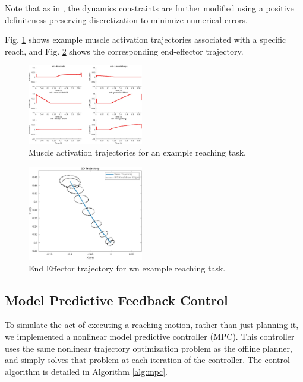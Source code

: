 \documentclass[letterpaper, 10pt, conference]{ieeeconf}
\newcommand{\todo}[1]{\textcolor{red}{\textbf{TODO:} #1}}
\begin{document}
Note that as in \cite{stochastic_model}, the dynamics constraints are further modified using a positive definiteness preserving discretization to minimize numerical errors.

Fig. \ref{fig:demo_activations} shows example muscle activation trajectories associated with a specific reach, and Fig. \ref{fig:demo_position} shows the corresponding end-effector trajectory.
\begin{figure}
    \centering
    \includegraphics[width=0.45\textwidth]{images/demo_activations_small.jpg}
    \caption{Muscle activation trajectories for an example reaching task.}
    \label{fig:demo_activations}
\end{figure}

\begin{figure}
    \centering
    \includegraphics[width=0.45\textwidth]{images/demo_traj_small.jpg}
    \caption{End Effector trajectory for wn example reaching task.}
    \label{fig:demo_position}
\end{figure}


\subsection{Model Predictive Feedback Control}
To simulate the act of executing a reaching motion, rather than just planning it, we implemented a nonlinear model predictive controller (MPC). This controller uses the same nonlinear trajectory optimization problem as the offline planner, and simply solves that problem at each iteration of the controller. The control algorithm is detailed in Algorithm \ref{alg:mpc}.
\end{document}
